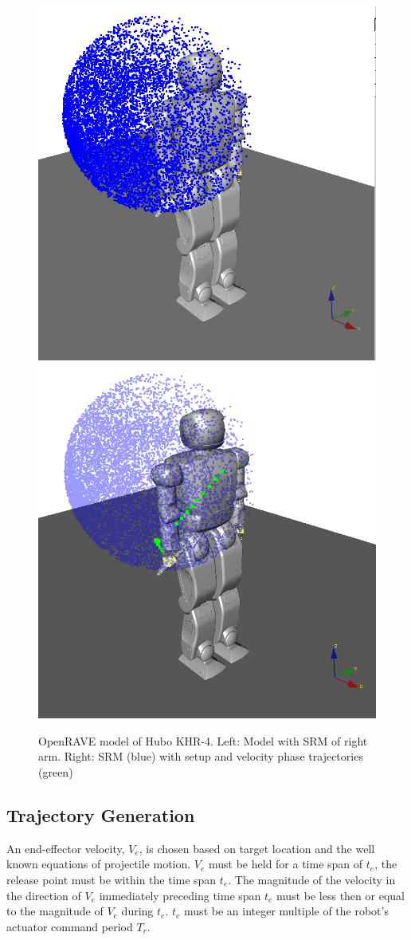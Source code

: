 \begin{figure}[thpb]
  \centering
\includegraphics[width=0.5\columnwidth]{./pictures/final/SRM.png}\includegraphics[width=0.5\columnwidth]{./pictures/final/ThrowTrajDiag.png}
  \caption{OpenRAVE model of Hubo KHR-4. Left: Model with SRM of right arm.  Right: SRM (blue) with setup and velocity phase trajectories (green)  }
  \label{fig:vHuboSparse}
\end{figure}



\subsection{Trajectory Generation}
An end-effector velocity, $V_e$, is chosen based on target location and the well known equations of projectile motion.  $V_e$ must be held for a time span of $t_e$, the release point must be within the time span $t_e$.  The magnitude of the velocity in the direction of $V_e$ immediately preceding time span $t_e$ must be less then or equal to the magnitude of $V_e$ during $t_e$.  $t_e$ must be an integer multiple of the robot's actuator command period $T_r$.

